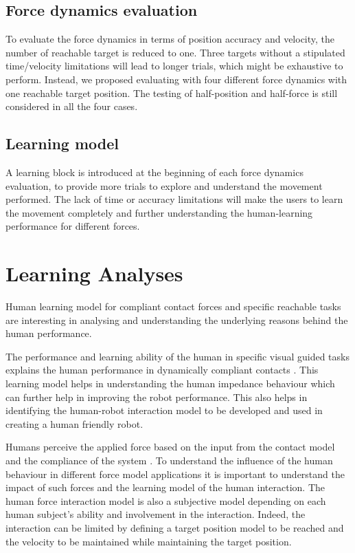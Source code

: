\subsection{Force dynamics evaluation}
To evaluate the force dynamics in terms of position accuracy and velocity, the number of reachable target is reduced to one. Three targets without a stipulated time/velocity limitations will lead to longer trials, which might be exhaustive to perform.  Instead, we proposed evaluating with four different force dynamics with one reachable target position. The testing of half-position and half-force is still considered in all the four cases.

\subsection{Learning model}
A learning block is introduced at the beginning of each force dynamics evaluation, to provide more trials to explore and understand the movement performed. The lack of time or accuracy limitations will make the users to learn the movement completely and further understanding the human-learning performance for different forces.

\section{Learning Analyses}
Human learning model for compliant contact forces and specific reachable tasks are interesting in analysing and understanding the underlying reasons behind the human performance. 

The performance and learning ability of the human in specific visual guided tasks explains the human performance in dynamically compliant contacts \cite{ernst2002}. This learning model helps in understanding the human impedance behaviour which can further help in improving the robot performance. This also helps in identifying the human-robot interaction model to be developed and used in creating a human friendly robot. 

Humans perceive the applied force based on the input from the contact model and the compliance of the system \cite{pongrac2006}. To understand the influence of the human behaviour in different force model applications it is important to understand the impact of such forces and the learning model of the human interaction. The human force interaction model is also a subjective model depending on  each human subject’s ability and involvement in the interaction. Indeed, the interaction can be limited by defining a target position model to be reached and the velocity to be maintained while maintaining the target position.

